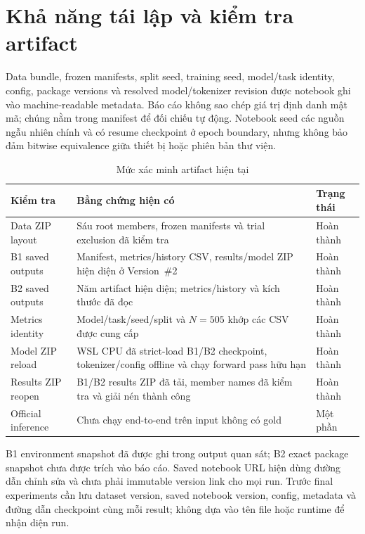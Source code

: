 \documentclass[11pt,a4paper]{article}
\newcommand{\statusok}{\textcolor{green!45!black}{Hoàn thành}}
\newcommand{\statuspartial}{\textcolor{orange!75!black}{Một phần}}
\begin{document}
\section{Khả năng tái lập và kiểm tra artifact}

Data bundle, frozen manifests, split seed, training seed, model/task identity, config, package versions và resolved model/tokenizer revision được notebook ghi vào machine-readable metadata. Báo cáo không sao chép giá trị định danh mật mã; chúng nằm trong manifest để đối chiếu tự động. Notebook seed các nguồn ngẫu nhiên chính và có resume checkpoint ở epoch boundary, nhưng không bảo đảm bitwise equivalence giữa thiết bị hoặc phiên bản thư viện.

\begin{table}[htbp]
\centering
\caption{Mức xác minh artifact hiện tại}
\small
\begin{tabularx}{\textwidth}{@{}p{}Yp{0.18\textwidth}@{}}
\toprule
Kiểm tra & Bằng chứng hiện có & Trạng thái \\
\midrule
Data ZIP layout & Sáu root members, frozen manifests và trial exclusion đã kiểm tra & \statusok \\
B1 saved outputs & Manifest, metrics/history CSV, results/model ZIP hiện diện ở Version~\#2 & \statusok \\
B2 saved outputs & Năm artifact hiện diện; metrics/history và kích thước đã đọc & \statusok \\
Metrics identity & Model/task/seed/split và $N=505$ khớp các CSV được cung cấp & \statusok \\
Model ZIP reload & WSL CPU đã strict-load B1/B2 checkpoint, tokenizer/config offline và chạy forward pass hữu hạn & \statusok \\
Results ZIP reopen & B1/B2 results ZIP đã tải, member names đã kiểm tra và giải nén thành công & \statusok \\
Official inference & Chưa chạy end-to-end trên input không có gold & \statuspartial \\
\bottomrule
\end{tabularx}
\end{table}

B1 environment snapshot đã được ghi trong output quan sát; B2 exact package snapshot chưa được trích vào báo cáo. Saved notebook URL hiện dùng đường dẫn chỉnh sửa và chưa phải immutable version link cho mọi run. Trước final experiments cần lưu dataset version, saved notebook version, config, metadata và đường dẫn checkpoint cùng mỗi result; không dựa vào tên file hoặc runtime để nhận diện run.
\end{document}
